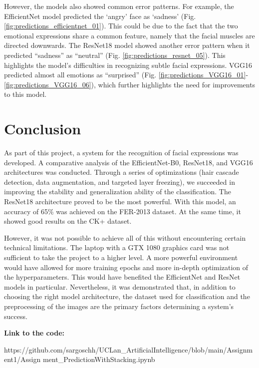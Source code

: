 However, the models also showed common error patterns. For example, the EfficientNet model predicted the ‘angry’ face as ‘sadness’ (Fig. \ref{fig:predictions_efficientnet_01}). This could be due to the fact that the two emotional expressions share a common feature, namely that the facial muscles are directed downwards. The ResNet18 model showed another error pattern when it predicted “sadness” as “neutral” (Fig. \ref{fig:predictions_resnet_05}). This highlights the model’s difficulties in recognizing subtle facial expressions. VGG16 predicted almost all emotions as “surprised” (Fig. \ref{fig:predictions_VGG16_01}-\ref{fig:predictions_VGG16_06}), which further highlights the need for improvements to this model.
\newline

\chapter{Conclusion}

As part of this project, a system for the recognition of facial expressions was developed. A comparative analysis of the EfficientNet-B0, ResNet18, and VGG16 architectures was conducted. Through a series of optimizations (hair cascade detection, data augmentation, and targeted layer freezing), we succeeded in improving the stability and generalization ability of the classification. The ResNet18 architecture proved to be the most powerful. With this model, an accuracy of 65\% was achieved on the FER-2013 dataset. At the same time, it showed good results on the CK+ dataset.

However, it was not possible to achieve all of this without encountering certain technical limitations. The laptop with a GTX 1080 graphics card was not sufficient to take the project to a higher level. A more powerful environment would have allowed for more training epochs and more in-depth optimization of the hyperparameters. This would have benefited the EfficientNet and ResNet models in particular. Nevertheless, it was demonstrated that, in addition to choosing the right model architecture, the dataset used for classification and the preprocessing of the images are the primary factors determining a system’s success.

\textbf{Link to the code:}

https://github.com/sargoschh/UCLan\_ArtificialIntelligence/blob/main/Assignment1/Assign
ment\_PredictionWithStacking.ipynb
\newline